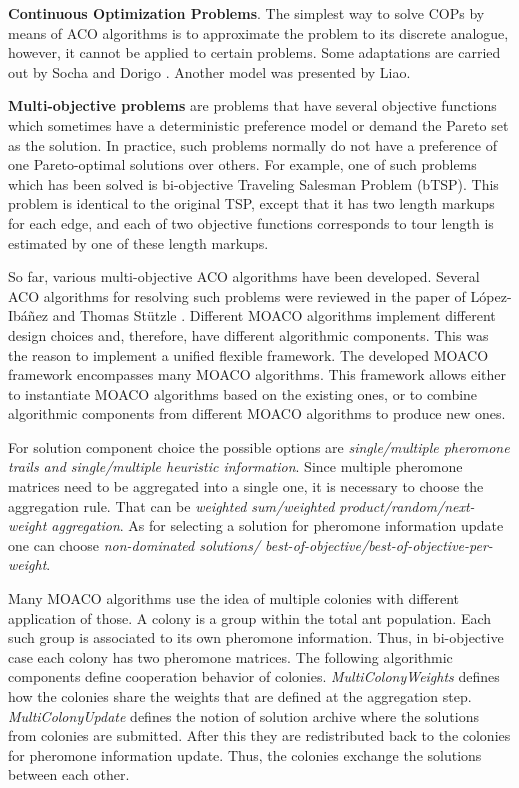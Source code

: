 \documentclass[12pt]{article}
\begin{document}
\textbf{Continuous Optimization Problems}. The simplest way to solve COPs by means of ACO algorithms is to approximate the problem to its discrete analogue, however, it cannot be applied to certain problems. Some adaptations are carried out by Socha and Dorigo \cite{aco_continuous}. Another model was presented by Liao\cite{aco_incremental}.

\textbf{Multi-objective problems} are problems that have several objective functions which sometimes have a deterministic preference model or demand the Pareto set as the solution. In practice, such problems normally do not have a preference of one Pareto-optimal solutions over others. For example, one of such problems which has been solved is bi-objective Traveling Salesman Problem (bTSP). This problem is identical to the original TSP, except that it has two length markups for each edge, and each of two objective functions corresponds to tour length is estimated by one of these length markups.

So far, various multi-objective ACO algorithms have been developed. Several ACO algorithms for resolving such problems were reviewed in the paper of L{\'o}pez-Ib{\'a}{\~n}ez and Thomas St{\"u}tzle \cite{moaco}. Different MOACO algorithms implement different design choices and, therefore, have different algorithmic components. This was the reason to implement a unified flexible framework. The developed MOACO framework encompasses many MOACO algorithms. This framework allows either to instantiate MOACO algorithms based on the existing ones, or to combine algorithmic components from different MOACO algorithms to produce new ones.

For solution component choice the possible options are \emph{single/multiple pheromone trails and single/multiple heuristic information}. Since multiple pheromone matrices need to be aggregated into a single one, it is necessary to choose the aggregation rule. That can be \emph{weighted sum/weighted product/random/next-weight aggregation}. As for selecting a solution for pheromone information update one can choose \emph{non-dominated solutions/ best-of-objective/best-of-objective-per-weight}.

Many MOACO algorithms use the idea of multiple colonies with different application of those. A colony is a group within the total ant population. Each such group is associated to its own pheromone information. Thus, in bi-objective case each colony has two pheromone matrices. The following algorithmic components define cooperation behavior of colonies. \emph{MultiColonyWeights} defines how the colonies share the weights that are defined at the aggregation step. \emph{MultiColonyUpdate} defines the notion of solution archive where the solutions from colonies are submitted. After this they are redistributed back to the colonies for pheromone information update. Thus, the colonies exchange the solutions between each other.
\end{document}
